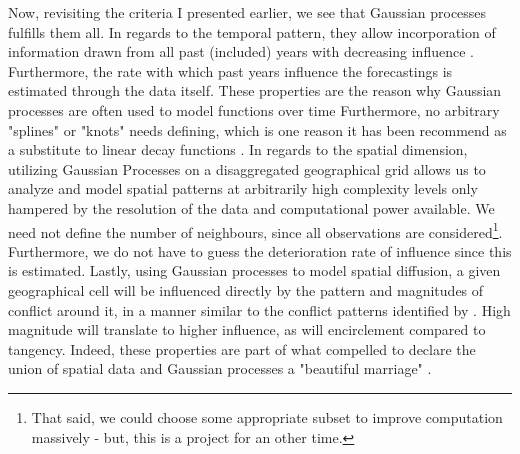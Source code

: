 \documentclass[a4paper]{article}
\begin{document}

Now, revisiting the criteria I presented earlier, we see that Gaussian processes fulfills them all. In regards to the temporal pattern, they allow incorporation of information drawn from all past (included) years with decreasing influence \citep[410-419]{Mcelreath_2018}. Furthermore, the rate with which past years influence the forecastings is estimated through the data itself. These properties are the reason why Gaussian processes are often used to model functions over time \citep[13]{williams2006gaussian} Furthermore, no arbitrary "splines" or "knots" needs defining, which is one reason it has been recommend as a substitute to linear decay functions \cite[501]{Gelman_2013}. In regards to the spatial dimension, utilizing Gaussian Processes on a disaggregated geographical grid allows us to analyze and model spatial patterns at arbitrarily high complexity levels only hampered by the resolution of the data and computational power available. We need not define the number of neighbours, since all observations are considered\footnote{That said, we could choose some appropriate subset to improve computation massively \citep{gelfand2016spatial} - but, this is a project for an other time.}. Furthermore, we do not have to guess the deterioration rate of influence since this is estimated. Lastly, using Gaussian processes to model spatial diffusion, a given geographical cell will be influenced directly by the pattern and magnitudes of conflict around it, in a manner similar to the conflict patterns identified by \cite{schutte2011diffusion}. High magnitude will translate to higher influence, as will encirclement compared to tangency. Indeed, these properties are part of what compelled \cite{gelfand2016spatial} to declare the union of spatial data and Gaussian processes a "beautiful marriage" \citep[86]{gelfand2016spatial}.

\end{document}
